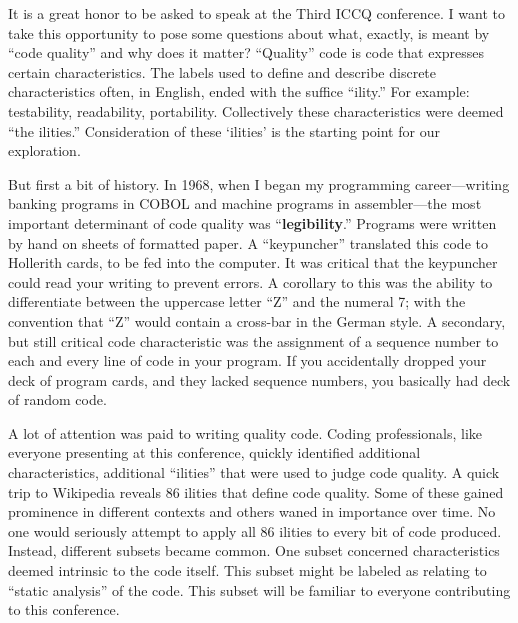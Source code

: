
\cleardoublepage
{}

It is a great honor to be asked to speak at the Third ICCQ conference. I want to take this
opportunity to pose some questions about what, exactly, is meant by ``code quality'' and why does it matter?
``Quality'' code is code that expresses certain characteristics. The labels used to define
and describe discrete characteristics often, in English, ended with the suffice ``ility.''
For example: testability, readability, portability. Collectively these characteristics were
deemed ``the ilities.'' Consideration of these ‘ilities’ is the starting point for our exploration.

But first a bit of history. In 1968, when I began my programming career—writing banking programs in COBOL and machine programs in assembler—the most important determinant of code quality was ``\textbf{legibility}.''
Programs were written by hand on sheets of formatted paper. A ``keypuncher'' translated this code to Hollerith cards, to be fed into the computer. It was critical that the keypuncher  could read your writing to prevent errors. A corollary to this was the ability to differentiate between the uppercase letter ``Z'' and the numeral 7; with the convention that ``Z'' would contain a cross-bar in the German style.
A secondary, but still critical code characteristic was the assignment of a sequence number to each and every
line of code in your program. If you accidentally dropped your deck of program cards, and
they lacked sequence numbers, you basically had deck of random code.

A lot of attention was paid to writing quality code. Coding professionals, like everyone presenting at this conference, quickly identified additional characteristics, additional ``ilities'' that were used to judge code quality. A quick trip to Wikipedia reveals 86 ilities that define code quality. Some of these gained prominence in different contexts and others waned in importance over time.
No one would seriously attempt to apply all 86 ilities to every bit of code produced. Instead, different subsets became common. One subset concerned characteristics deemed intrinsic to the code itself. This subset might be labeled as relating to ``static analysis'' of the code. This subset will be familiar to everyone contributing to this conference.

